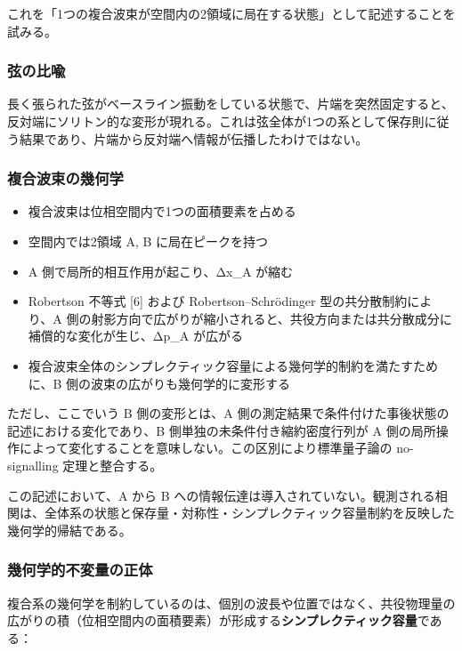 \documentclass[
]{ltjsarticle}
\providecommand{\tightlist}{%
  \setlength{\itemsep}{0pt}\setlength{\parskip}{0pt}}
\begin{document}
これを「1つの複合波束が空間内の2領域に局在する状態」として記述することを試みる。

\subsubsection{弦の比喩}\label{ux5f26ux306eux6bd4ux55a9}

長く張られた弦がベースライン振動をしている状態で、片端を突然固定すると、反対端にソリトン的な変形が現れる。これは弦全体が1つの系として保存則に従う結果であり、片端から反対端へ情報が伝播したわけではない。

\subsubsection{複合波束の幾何学}\label{ux8907ux5408ux6ce2ux675fux306eux5e7eux4f55ux5b66}

\begin{itemize}
\tightlist
\item
  複合波束は位相空間内で1つの面積要素を占める
\item
  空間内では2領域 A, B に局在ピークを持つ
\item
  A 側で局所的相互作用が起こり、Δx\_A が縮む
\item
  Robertson 不等式 {[}6{]} および Robertson--Schrödinger
  型の共分散制約により、A
  側の射影方向で広がりが縮小されると、共役方向または共分散成分に補償的な変化が生じ、Δp\_A
  が広がる
\item
  複合波束全体のシンプレクティック容量による幾何学的制約を満たすために、B
  側の波束の広がりも幾何学的に変形する
\end{itemize}

ただし、ここでいう B 側の変形とは、A
側の測定結果で条件付けた事後状態の記述における変化であり、B
側単独の未条件付き縮約密度行列が A
側の局所操作によって変化することを意味しない。この区別により標準量子論の
no-signalling 定理と整合する。

この記述において、A から B
への情報伝達は導入されていない。観測される相関は、全体系の状態と保存量・対称性・シンプレクティック容量制約を反映した幾何学的帰結である。

\subsubsection{幾何学的不変量の正体}\label{ux5e7eux4f55ux5b66ux7684ux4e0dux5909ux91cfux306eux6b63ux4f53}

複合系の幾何学を制約しているのは、個別の波長や位置ではなく、共役物理量の広がりの積（位相空間内の面積要素）が形成する\textbf{シンプレクティック容量}である：
\end{document}
